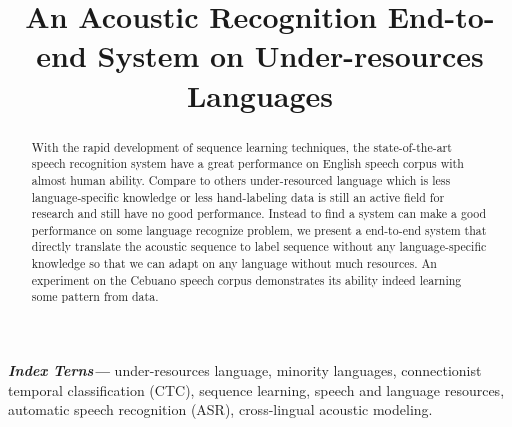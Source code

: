 \documentclass[conference]{IEEEtran}
\providecommand{\keywords}[1]{\textbf{\textit{Index Terns---}} #1}
\begin{document}
\title{An Acoustic Recognition End-to-end System on Under-resources Languages}

\author{

\and
{}
}

\maketitle

\begin{abstract}
With the rapid development of sequence learning techniques, the state-of-the-art speech recognition system have a great performance on English speech corpus with almost human ability.  Compare to others under-resourced language which is less language-specific knowledge or less hand-labeling data is still an active field for research and still have no good performance.  Instead to find a system can make a good performance on some language recognize problem, we present a end-to-end system that directly translate the acoustic sequence to label sequence without any language-specific knowledge so that we can adapt on any language without much resources.  An experiment on the Cebuano speech corpus demonstrates its ability indeed learning some pattern from data.\\
\end{abstract}

\keywords{under-resources language, minority languages, connectionist temporal classification (CTC), sequence learning, speech and language resources, automatic speech recognition (ASR), cross-lingual acoustic modeling.}


%
\IEEEpeerreviewmaketitle
\end{document}
